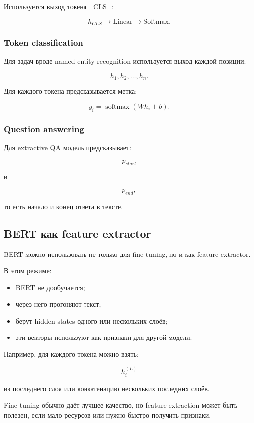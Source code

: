 \documentclass[a4paper,12pt]{article}
\begin{document}
Используется выход токена \([\text{CLS}]\):

\[
h_{CLS}
\rightarrow
\text{Linear}
\rightarrow
\text{Softmax}.
\]

\subsubsection{Token classification}

Для задач вроде named entity recognition используется выход каждой позиции:

\[
h_1, h_2, \dots, h_n.
\]

Для каждого токена предсказывается метка:

\[
y_i = \operatorname{softmax}(Wh_i+b).
\]

\subsubsection{Question answering}

Для extractive QA модель предсказывает:

\[
p_{start}
\]

и

\[
p_{end},
\]

то есть начало и конец ответа в тексте.

\subsection{BERT как feature extractor}

BERT можно использовать не только для fine-tuning, но и как feature extractor.

В этом режиме:

\begin{itemize}
    \item BERT не дообучается;
    \item через него прогоняют текст;
    \item берут hidden states одного или нескольких слоёв;
    \item эти векторы используют как признаки для другой модели.
\end{itemize}

Например, для каждого токена можно взять:

\[
h_i^{(L)}
\]

из последнего слоя или конкатенацию нескольких последних слоёв.

Fine-tuning обычно даёт лучшее качество, но feature extraction может быть полезен, если мало ресурсов или нужно быстро получить признаки.
\end{document}
